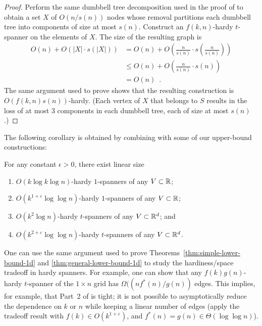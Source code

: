 \documentclass[final]{siamltex}
\newcommand{\eps}{\varepsilon}
\begin{document}
\begin{proof}
  Perform the same dumbbell tree decomposition used in the proof of
   to obtain a set $X$ of $O(n/s(n))$ nodes whose removal
  partitions each dumbbell tree into components of size at most $s(n)$.
  Construct an $f(k,n)$-hardy $t$-spanner on the elements of $X$.
  The size of the resulting graph is 
  \begin{align*}
    O(n) + O(|X|\cdot s(|X|)) 
       & = O(n) + O\left(\frac{n}{s(n)}\cdot s\left(\frac{n}{s(n)}\right)\right) \\
       & \le O(n) + O\left(\frac{n}{s(n)}\cdot s(n)\right) \\
       & = O(n) \enspace . 
  \end{align*}
  The same argument used to prove  shows that the resulting
  construction is $O(f(k,n)s(n))$-hardy.  (Each vertex of $X$ that
  belongs to $S$ results in the loss of at most 3 components in each
  dumbbell tree, each of size at most $s(n)$.)
\end{proof}

The following corollary is obtained by combining 
with some of our upper-bound constructions:
\begin{cor}
  For any constant $\epsilon >0$, there exist linear size
  \begin{enumerate}
    \item $O(k\log k\log n)$-hardy $1$-spanners of any
      $V\subset \mathbb{R}$;
    \item $O(k^{1+\eps}\log\log n)$-hardy $1$-spanners of any
      $V\subset \mathbb{R}$;
    \item $O(k^2\log n)$-hardy $t$-spanners of any
      $V\subset \mathbb{R}^d$; and
    \item $O(k^{2+\eps}\log\log n)$-hardy $t$-spanners of any
      $V\subset \mathbb{R}^d$.
  \end{enumerate}
\end{cor}


\begin{rem}
One can use the same argument used to prove
Theorems~\ref{thm:simple-lower-bound-1d} and
\ref{thm:general-lower-bound-1d} to study the hardiness/space tradeoff
in hardy spanners.  For example, one can show that any $f(k)g(n)$-hardy
$t$-spanner of the $1\times n$ grid has $\Omega((nf^*(n)/g(n))$ edges.
This implies, for example, that Part~2 of  is tight;
it is not possible to asymptotically reduce the dependence on $k$ or $n$
while keeping a linear number of edges (apply the tradeoff result with
$f(k)\in O(k^{1+\eps})$, and $f^*(n)=g(n)\in \Theta(\log\log n)$).
\end{rem}
\end{document}
